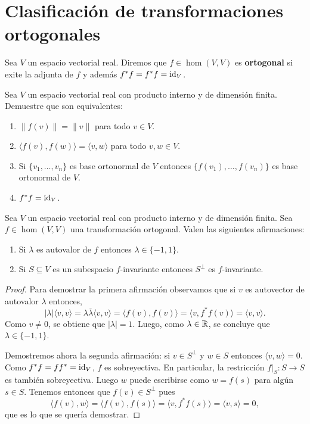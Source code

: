 \section{Clasificación de transformaciones ortogonales}

\begin{block}
    Sea $V$ un espacio vectorial real. Diremos que $f\in\hom(V,V)$ es 
    \textbf{ortogonal} si exite la adjunta de $f$ y además $f^*f=f^*f=\operatorname{id}_V$. 
\end{block}

\begin{xca}
    \label{xca:ortogonal}
    Sea $V$ un espacio vectorial real con producto interno y de dimensión
    finita. Demuestre que son equivalentes:
    \begin{enumerate}
        \item $\|f(v)\|=\|v\|$ para todo $v\in V$.
        \item $\langle f(v),f(w)\rangle=\langle v,w\rangle$ para todo $v,w\in
            V$.
        \item Si $\{v_1,\dots,v_n\}$ es base ortonormal de $V$ entonces
            $\{f(v_1),\dots,f(v_n)\}$ es base ortonormal de $V$.
        \item $f^*f=\operatorname{id}_V$.
    \end{enumerate}
\end{xca}

\begin{lem}
    \label{lem:ortogonal}
    Sea $V$ un espacio vectorial real con producto interno y de dimensión
    finita. Sea $f\in\hom(V,V)$ una transformación ortogonal. Valen las
    siguientes afirmaciones:
    \begin{enumerate}
        \item Si $\lambda$ es autovalor de $f$ entonces $\lambda\in\{-1,1\}$.
        \item Si $S\subseteq V$ es un subespacio $f$-invariante entonces
            $S^\perp$ es $f$-invariante.
    \end{enumerate}

    \begin{proof}
        Para demostrar la primera afirmación observamos que si $v$ es
        autovector de autovalor $\lambda$ entonces, 
        \[
        |\lambda|\langle v,v\rangle=\lambda\overline{\lambda}\langle v,v\rangle=\langle f(v),f(v)\rangle=\langle v,f^*f(v)\rangle=\langle v,v\rangle.
        \]
        Como $v\ne0$, se obtiene que $|\lambda|=1$. Luego, como $\lambda\in\mathbb{R}$,
        se concluye que $\lambda\in\{-1,1\}$. 

        Demostremos ahora la segunda afirmación: si $v\in S^\perp$ y $w\in S$
        entonces $\langle v,w\rangle=0$.  Como $f^*f=ff^*=\operatorname{id}_V$, $f$ es
        sobreyectiva. En particular, la restricción $f|_S\colon S\to S$ es también
        sobreyectiva. Luego $w$ puede escribirse como $w=f(s)$ para algún $s\in
        S$. Tenemos entonces que $f(v)\in S^\perp$ pues 
        \[
        \langle f(v),w\rangle=\langle f(v),f(s)\rangle=\langle v,f^*f(s)\rangle=\langle v,s\rangle=0,
        \]
        que es lo que se quería demostrar.
    \end{proof}
\end{lem}

